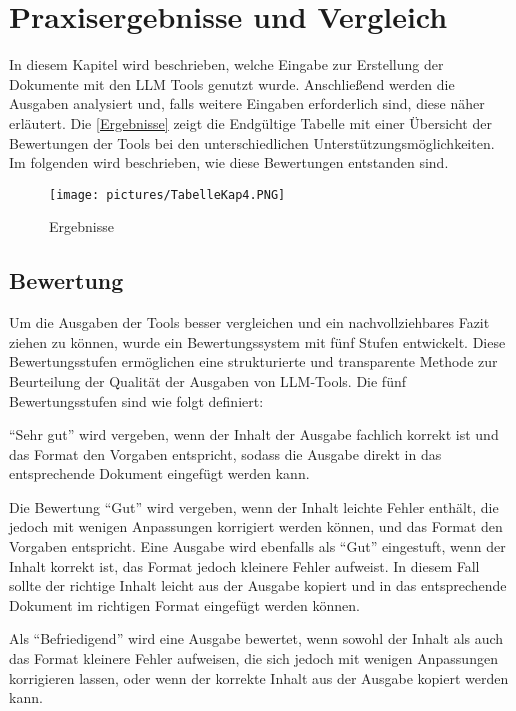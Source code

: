 
\chapter{Praxisergebnisse und Vergleich} 

In diesem Kapitel wird beschrieben, welche Eingabe zur Erstellung der Dokumente mit den LLM Tools 
genutzt wurde. Anschließend werden die Ausgaben analysiert und, falls weitere Eingaben erforderlich sind, 
diese näher erläutert. Die \autoref{Ergebnisse} zeigt die Endgültige Tabelle mit einer Übersicht der Bewertungen 
der Tools bei den unterschiedlichen Unterstützungsmöglichkeiten. Im folgenden wird beschrieben, wie diese Bewertungen 
entstanden sind.

\begin{figure}
    \centering
    \texttt{[image: pictures/TabelleKap4.PNG]}
    \caption{Ergebnisse}
    \label{Ergebnisse}
\end{figure}

\section*{Bewertung}

Um die Ausgaben der Tools besser vergleichen und ein nachvollziehbares Fazit ziehen zu können, wurde ein Bewertungssystem 
mit fünf Stufen entwickelt. Diese Bewertungsstufen ermöglichen eine strukturierte und transparente Methode zur Beurteilung 
der Qualität der Ausgaben von LLM-Tools. Die fünf Bewertungsstufen sind wie folgt definiert:

``Sehr gut'' wird vergeben, wenn der Inhalt der Ausgabe fachlich korrekt ist und das Format den Vorgaben entspricht, sodass 
die Ausgabe direkt in das entsprechende Dokument eingefügt werden kann.

Die Bewertung ``Gut'' wird vergeben, wenn der Inhalt leichte Fehler enthält, die jedoch mit wenigen Anpassungen korrigiert 
werden können, und das Format den Vorgaben entspricht. Eine Ausgabe wird ebenfalls als ``Gut'' eingestuft, wenn der Inhalt 
korrekt ist, das Format jedoch kleinere Fehler aufweist. In diesem Fall sollte der richtige Inhalt leicht aus der Ausgabe 
kopiert und in das entsprechende Dokument im richtigen Format eingefügt werden können.

Als ``Befriedigend'' wird eine Ausgabe bewertet, wenn sowohl der Inhalt als auch das Format kleinere Fehler aufweisen, die sich 
jedoch mit wenigen Anpassungen korrigieren lassen, oder wenn der korrekte Inhalt aus der Ausgabe kopiert werden kann.

